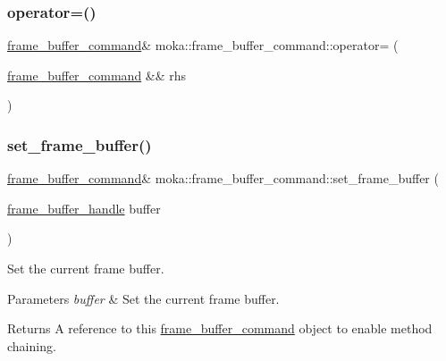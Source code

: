 \subsubsection{\texorpdfstring{operator=()}{operator=()}\hspace{0.1cm}{\footnotesize\ttfamily [2/2]}}
{\footnotesize\ttfamily \mbox{\hyperlink{classmoka_1_1frame__buffer__command}{frame\+\_\+buffer\+\_\+command}}\& moka\+::frame\+\_\+buffer\+\_\+command\+::operator= (\begin{DoxyParamCaption}\item[{\mbox{\hyperlink{classmoka_1_1frame__buffer__command}{frame\+\_\+buffer\+\_\+command}} \&\&}]{rhs }\end{DoxyParamCaption})\hspace{0.3cm}{\ttfamily [noexcept]}}

\mbox{\label{classmoka_1_1frame__buffer__command_ad56ea45eee3171897e0a15eb41acccf0}} 
\subsubsection{\texorpdfstring{set\_frame\_buffer()}{set\_frame\_buffer()}}
{\footnotesize\ttfamily \mbox{\hyperlink{classmoka_1_1frame__buffer__command}{frame\+\_\+buffer\+\_\+command}}\& moka\+::frame\+\_\+buffer\+\_\+command\+::set\+\_\+frame\+\_\+buffer (\begin{DoxyParamCaption}\item[{\mbox{\hyperlink{structmoka_1_1frame__buffer__handle}{frame\+\_\+buffer\+\_\+handle}}}]{buffer }\end{DoxyParamCaption})}



Set the current frame buffer. 


\begin{DoxyParams}{Parameters}
{\em buffer} & Set the current frame buffer. \\
\hline
\end{DoxyParams}
\begin{DoxyReturn}{Returns}
A reference to this \mbox{\hyperlink{classmoka_1_1frame__buffer__command}{frame\+\_\+buffer\+\_\+command}} object to enable method chaining. 
\end{DoxyReturn}


